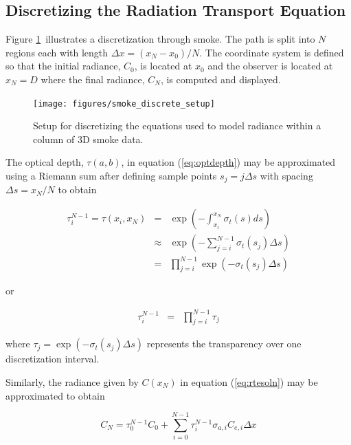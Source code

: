 \subsection{Discretizing the Radiation Transport Equation}
\newcommand{\htau}[1]{\tau_{#1}^{N-1}}
\newcommand{\sigai}[1]{\sigma_{a,#1}}
\newcommand{\Lei}[1]{C_{e,#1}}
\newcommand{\Lhatj}[1]{C_{#1}^N}
\newcommand{\Lhatjj}[1]{\hat{C}_{#1}^N}
\newcommand{\Chatjj}[1]{\hat{C}_{#1}^N}
\newcommand{\Leii}[1]{\hat{C}_{e,#1}}


Figure \ref{fig:smokediscretesetup}\ illustrates a discretization through  smoke.  The path is split into $N$ regions each with length $\Delta x=(x_N-x_0)/N$.  The coordinate system is defined so that the initial radiance, $C_0$, is located at $x_0$ and the observer is located at $x_N=D$  where the final radiance, $C_N$, is computed and displayed.

\begin{figure}[\figoptions]
\begin{center}
\texttt{[image: figures/smoke\_discrete\_setup]}
\end{center}
\caption {Setup for discretizing the equations used to model
radiance within a column of 3D smoke data.}
\label{fig:smokediscretesetup}
\end{figure}

The optical depth, $\tau(a,b)$, in equation (\ref{eq:optdepth}) may be approximated using a Riemann sum  after defining sample points $s_j=j\Delta s$ with spacing $\Delta s=x_N/N$ to obtain

\begin{eqnarray*}
\htau{i}=\tau(x_i,x_N)&=&\exp\left(-\int_{x_i}^{x_N}\sigma_t(s)ds\right)\\
&\approx&\exp\left(-\sum_{j=i}^{N-1}\sigma_t(s_j)\Delta s\right)\\
&=&\prod_{j=i}^{N-1}\exp\left(-\sigma_t(s_j)\Delta s\right)
\end{eqnarray*}

or

\begin{eqnarray}
\label{eq:tauhat_discrete}
\htau{i}&=&\prod_{j=i}^{N-1}\tau_j
\end{eqnarray}

where $\tau_j=\exp\left(-\sigma_t(s_j)\Delta s\right)$ represents the transparency over one discretization interval.

Similarly, the radiance given by $C(x_N)$ in equation (\ref{eq:rtesoln}) may be approximated to obtain

\begin{equation}
\label{eq:discrete_rte}
C_{N} = \htau{0}C_0 +
\sum_{i=0}^{N-1}\htau{i}\sigai{i}\Lei{i}\Delta x
\end{equation}

